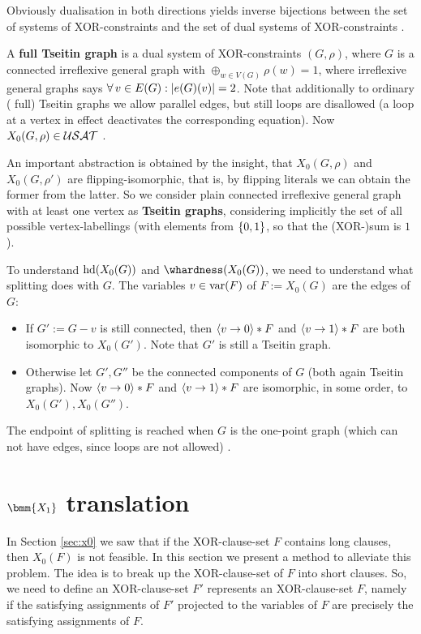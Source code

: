 \documentclass[12pt]{book}
\begin{document}
Obviously dualisation in both directions yields inverse bijections between the set of systems of XOR-constraints and the set of dual systems of XOR-constraints \cite{h5}.

\begin{defi}\label{def:tgraph}
\cite{h5} A \textbf{full Tseitin graph} is a dual system of XOR-constraints $(G,\rho)$, where $G$ is a connected irreflexive general graph with 
$\oplus_{w \in V(G)} \rho(w) = 1$, where irreflexive general graphs says $\forall\, v \in E(G) : \lvert e(G)(v) \rvert = 2$. Note that additionally to ordinary (
full) Tseitin graphs we allow parallel edges, but still loops are disallowed (a loop at a vertex in effect deactivates the corresponding equation). 
Now $X_0(G,\rho) \in \mathcal{USAT}$ .
\end{defi}

An important abstraction is obtained by the insight, that $X_0(G,\rho)$ and $X_0(G,\rho')$ are flipping-isomorphic, that is, by flipping literals we 
can obtain the former from the latter. So we consider plain connected irreflexive general graph with at least one vertex as \textbf{Tseitin graphs}, 
considering implicitly the set of all possible vertex-labellings (with elements from $\{ 0,1 \}$, so that the (XOR-)sum is $1$).

To understand $\operatorname{hd}(X_0(G))$ and $\whardness(X_0(G))$, we need to understand what splitting does with $G$. 
The variables $v \in \operatorname{var}(F)$ of $F := X_0(G)$ are the edges of $G$:
\begin{itemize}
\item If $G' := G - v$ is still connected, then $\langle v \rightarrow 0 \rangle * F$ and $\langle v \rightarrow 1 \rangle * F$ are both isomorphic to $X_0(G')$. Note that $G'$ is still a Tseitin graph.
\item Otherwise let $G', G''$ be the connected components of $G$ (both again Tseitin graphs). Now $\langle v \rightarrow 0 \rangle * F$ and $\langle v \rightarrow 1 \rangle * F$ are isomorphic, in some 
order, to $X_0(G'), X_0(G'')$.
\end{itemize}
The endpoint of splitting is reached when $G$ is the one-point graph (which can not have edges, since loops are not allowed) \cite{h5}. 

\section{$\bmm{X_1}$ translation}
\label{sec:x1}

In Section \ref{sec:x0} we saw that if the XOR-clause-set $F$ contains long clauses, then $X_0(F)$ is not feasible.
In this section we present a method to alleviate this problem. The idea is to break up the XOR-clause-set of $F$ into short clauses. 
So, we need to define an XOR-clause-set $F'$ represents an XOR-clause-set $F$, namely if the satisfying assignments of $F'$ projected to 
the variables of $F$ are precisely the satisfying assignments of $F$.
\end{document}
